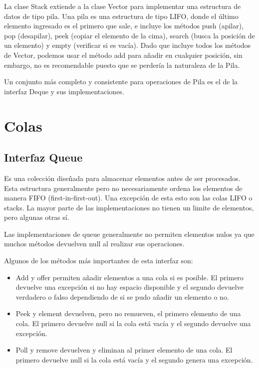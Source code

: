 \documentclass[11pt]{article}
\begin{document}
La clase Stack extiende a la clase Vector para implementar una 
estructura de datos de tipo pila. Una pila es una estructura de tipo 
LIFO, donde el último elemento ingresado es el primero que sale, e 
incluye los métodos push (apilar), pop (desapilar), peek (copiar el 
elemento de la cima), search (busca la posición de un elemento) y 
empty (verificar si es vacía). Dado que incluye todos los métodos de 
Vector, podemos usar el método add para añadir en cualquier posición, 
sin embargo, no es recomendable puesto que se perdería la naturaleza 
de la Pila.

\par

Un conjunto más completo y consistente para operaciones de Pila es el 
de la interfaz Deque y sus implementaciones. 

\section{Colas}

\subsection{Interfaz Queue}

\par

Es una colección diseñada para almacenar elementos antes de ser 
procesados. Esta estructura generalmente pero no necesariamente 
ordena los elementos de manera FIFO (first-in-first-out). Una 
excepción de esta esto son las colas LIFO o stacks. La mayor parte de 
las implementaciones no tienen un limite de elementos, pero algunas 
otras sí.

\par

Las implementaciones de queue generalmente no permiten elementos 
nulos ya que muchos métodos devuelven null al realizar sus 
operaciones.

\par

Algunos de los métodos más importantes de esta interfaz son:

\begin{itemize}

\item Add y offer permiten añadir elementos a una cola si es posible. 
El primero devuelve una excepción si no hay espacio disponible y el 
segundo devuelve verdadero o falso dependiendo de si se pudo añadir 
un elemento o no.

\item Peek y element devuelven, pero no remueven, el primero elemento 
de una cola. El primero devuelve null si la cola está vacía y el 
segundo devuelve una excepción.

\item Poll y remove devuelven y eliminan al primer elemento de una 
cola. El primero devuelve null si la cola está vacía y el segundo 
genera una excepción.  

\end{itemize}
\end{document}
